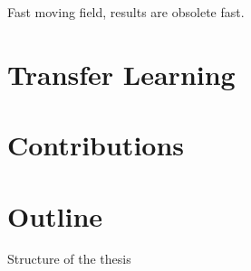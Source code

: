 Fast moving field, results are obsolete fast.

\section{Transfer Learning}

\section{Contributions}

\section{Outline}

Structure of the thesis

